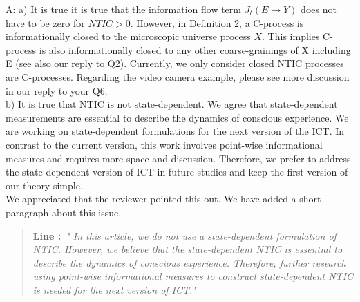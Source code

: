 \documentclass[utf8]{article}
\newenvironment{ans}  
    {\color{Black}\noindent A:}
    {~\newline}
\newcommand{\addnew}[2]{\blockcquote{}{\textbf{Line #1:}~\newline\textit{"#2"}}
}
\begin{document}
    	\begin{ans}
    		\newline
    		a) It is true it is true that the information flow term $J_t(E\rightarrow Y)$ does not have to be zero for $NTIC>0$. However, in Definition 2, a C-process is informationally closed to the microscopic universe process $X$. This implies C-process is also informationally closed to any other coarse-grainings of X including E (see also our reply to Q2). Currently, we only consider closed NTIC processes are C-processes. 
    		Regarding the video camera example, please see more discussion in our reply to your Q6. \\
    		

            		
    		\noindent
    		b) It is true that NTIC is not state-dependent. We agree that state-dependent measurements are essential to describe the dynamics of conscious experience. We are  working on state-dependent formulations for the next version of the ICT. In contrast to the current version, this work involves point-wise informational measures and requires more space and discussion. Therefore, we prefer to address the state-dependent version of ICT in future studies and keep the first version of our theory simple.\\
    		We appreciated that the reviewer pointed this out. We have added a short paragraph about this issue.
    	
	    	\addnew{}{
	    		In this article, we do not use a state-dependent formulation of NTIC. However, we believe that the state-dependent NTIC is essential to describe the dynamics of conscious experience. Therefore, further research using point-wise informational measures to construct state-dependent NTIC is needed for the next version of ICT.}
    	\end{ans}
        
\end{document}

